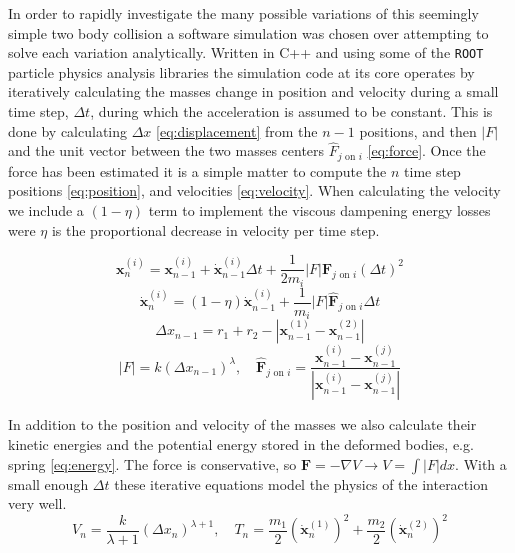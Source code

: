 \documentclass[aps,prl,floatfix,preprint,nofootinbib]{revtex4}
\begin{document}
In order to rapidly investigate the many possible variations of this seemingly simple two body collision a software simulation was chosen over attempting to solve each variation analytically. Written in C++ and using some of the \texttt{ROOT}~\cite{ref_root} particle physics analysis libraries the simulation code at its core operates by iteratively calculating the masses change in position and velocity during a small time step, $\Delta t$, during which the acceleration is assumed to be constant. This is done by calculating $\Delta x$ \eqref{eq:displacement} from the $n-1$ positions, and then $\left|F\right|$ and the unit vector between the two masses centers $\hat{F}_{j\text{ on }i}$ \eqref{eq:force}. Once the force has been estimated it is a simple matter to compute the $n$ time step positions \eqref{eq:position}, and velocities \eqref{eq:velocity}. When calculating the velocity we include a $\left(1-\eta\right)$ term to implement the viscous dampening energy losses were $\eta$ is the proportional decrease in velocity per time step.

\begin{equation}\label{eq:position}
\mathbf{x}^{(i)}_{n} = \mathbf{x}^{(i)}_{n-1} + \dot{\mathbf{x}}^{(i)}_{n-1} \Delta t + \frac{1}{2m_i} \left| F \right| \mathbf{\hat{F}}_{j\text{ on }i} \left(\Delta t\right)^2
\end{equation}
\begin{equation}\label{eq:velocity}
\dot{\mathbf{x}}^{(i)}_{n} = (1-\eta)\dot{\mathbf{x}}^{(i)}_{n-1} + \frac{1}{m_i} \left| F \right| \mathbf{\hat{F}}_{j\text{ on }i} \Delta t
\end{equation}
\begin{equation}\label{eq:displacement}
\Delta x_{n-1} = r_1 + r_2 - \left| \mathbf{x}^{(1)}_{n-1}-\mathbf{x}^{(2)}_{n-1} \right|
\end{equation}
\begin{equation}\label{eq:force}
\left| F \right| = k \left(\Delta x_{n-1}\right)^{\lambda},\quad \mathbf{\hat{F}}_{j\text{ on }i} = \frac{\mathbf{x}^{(i)}_{n-1}-\mathbf{x}^{(j)}_{n-1}}{\left|\mathbf{x}^{(i)}_{n-1}-\mathbf{x}^{(j)}_{n-1}\right|}
\end{equation}

In addition to the position and velocity of the masses we also calculate their kinetic energies and the potential energy stored in the deformed bodies, e.g. spring \eqref{eq:energy}. The force is conservative, so $\mathbf{F} = - \nabla V \rightarrow V = \int \left|F\right| dx$. With a small enough $\Delta t$ these iterative equations model the physics of the interaction very well. 
\begin{equation}\label{eq:energy}
V_n = \frac{k}{\lambda+1}\left(\Delta x_n\right)^{\lambda+1},\quad T_n = \frac{m_1}{2}\left(\dot{\mathbf{x}}^{(1)}_n\right)^2 + \frac{m_2}{2}\left(\dot{\mathbf{x}}^{(2)}_n\right)^2
\end{equation}
\end{document}
